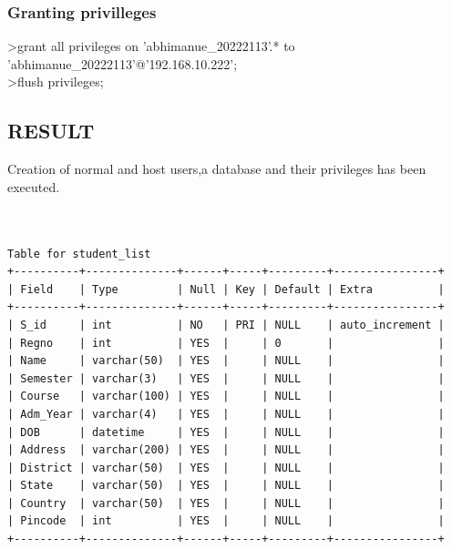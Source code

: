 \documentclass{article}
\begin{document}
\begin{flushleft}
\subsubsection{Granting privilleges}
\hspace{0.5in} \textgreater grant all privileges on 'abhimanue\_20222113'.* to\\ \hspace{0.6in} 'abhimanue\_20222113'@'192.168.10.222';\\
\hspace{0.8in} \textgreater flush privileges;\\

\subsection{RESULT}

Creation of normal and host users,a database and their privileges has been executed.

\end{flushleft}
\newpage
{}
\begin{verbatim}


Table for student_list
+----------+--------------+------+-----+---------+----------------+
| Field    | Type         | Null | Key | Default | Extra          |
+----------+--------------+------+-----+---------+----------------+
| S_id     | int          | NO   | PRI | NULL    | auto_increment |
| Regno    | int          | YES  |     | 0       |                |
| Name     | varchar(50)  | YES  |     | NULL    |                |
| Semester | varchar(3)   | YES  |     | NULL    |                |
| Course   | varchar(100) | YES  |     | NULL    |                |
| Adm_Year | varchar(4)   | YES  |     | NULL    |                |
| DOB      | datetime     | YES  |     | NULL    |                |
| Address  | varchar(200) | YES  |     | NULL    |                |
| District | varchar(50)  | YES  |     | NULL    |                |
| State    | varchar(50)  | YES  |     | NULL    |                |
| Country  | varchar(50)  | YES  |     | NULL    |                |
| Pincode  | int          | YES  |     | NULL    |                |
+----------+--------------+------+-----+---------+----------------+

\end{verbatim}
\newpage
\end{document}
